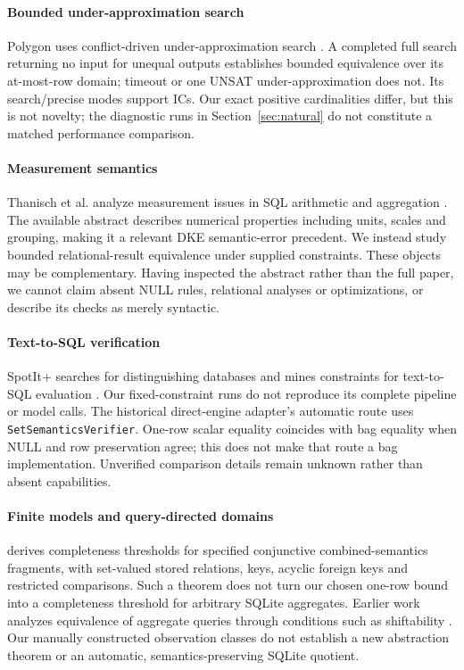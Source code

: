\documentclass[3p,times,authoryear]{elsarticle}
\begin{document}
\paragraph{Bounded under-approximation search}
Polygon uses conflict-driven under-approximation search \citep{zhao2025polygon}. A completed full search returning no input for unequal outputs establishes bounded equivalence over its at-most-row domain; timeout or one UNSAT under-approximation does not. Its search/precise modes support ICs. Our exact positive cardinalities differ, but this is not novelty; the diagnostic runs in Section~\ref{sec:natural} do not constitute a matched performance comparison.

\paragraph{Measurement semantics}
Thanisch et al. analyze measurement issues in SQL arithmetic and aggregation \citep{thanisch2019measurement}. The available abstract describes numerical properties including units, scales and grouping, making it a relevant DKE semantic-error precedent. We instead study bounded relational-result equivalence under supplied constraints. These objects may be complementary. Having inspected the abstract rather than the full paper, we cannot claim absent NULL rules, relational analyses or optimizations, or describe its checks as merely syntactic.

\paragraph{Text-to-SQL verification}
SpotIt+ searches for distinguishing databases and mines constraints for text-to-SQL evaluation \citep{tremante2026spotit}. Our fixed-constraint runs do not reproduce its complete pipeline or model calls. The historical direct-engine adapter's automatic route uses \texttt{SetSemanticsVerifier}. One-row scalar equality coincides with bag equality when NULL and row preservation agree; this does not make that route a bag implementation. Unverified comparison details remain unknown rather than absent capabilities.

\paragraph{Finite models and query-directed domains}
\citet{cohen2026fewrows} derives completeness thresholds for specified conjunctive combined-semantics fragments, with set-valued stored relations, keys, acyclic foreign keys and restricted comparisons. Such a theorem does not turn our chosen one-row bound into a completeness threshold for arbitrary SQLite aggregates. Earlier work analyzes equivalence of aggregate queries through conditions such as shiftability \citep{cohen2005equivalences}. Our manually constructed observation classes do not establish a new abstraction theorem or an automatic, semantics-preserving SQLite quotient.
\end{document}

